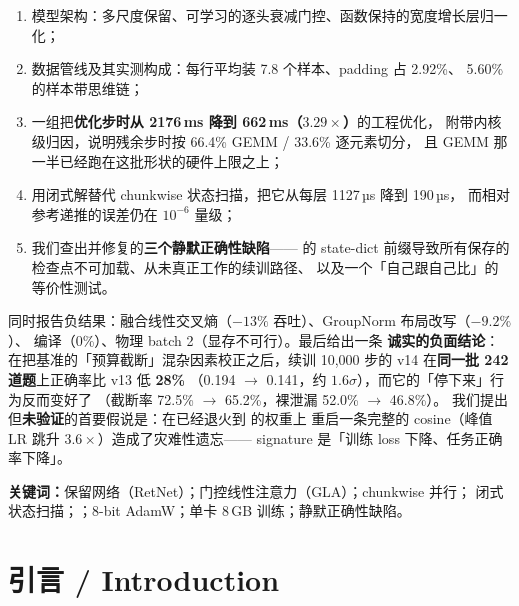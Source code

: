 \documentclass[11pt,openany]{ctexart}
\begin{document}
\begin{enumerate}[label=（\chinese{enumi}）]
\item 模型架构：多尺度保留、可学习的逐头衰减门控、函数保持的宽度增长层归一化；
\item 数据管线及其实测构成：每行平均装 7.8 个样本、padding 占 2.92\%、
      5.60\% 的样本带思维链；
\item 一组把\textbf{优化步时从 2176\,ms 降到 662\,ms（$3.29\times$）}的工程优化，
      附带内核级归因，说明残余步时按 66.4\% GEMM / 33.6\% 逐元素切分，
      且 GEMM 那一半已经跑在这批形状的硬件上限之上；
\item 用闭式解替代 chunkwise 状态扫描，把它从每层 1127\,µs 降到 190\,µs，
      而相对参考递推的误差仍在 $10^{-6}$ 量级；
\item 我们查出并修复的\textbf{三个静默正确性缺陷}—— 的
      state-dict 前缀导致所有保存的检查点不可加载、从未真正工作的续训路径、
      以及一个「自己跟自己比」的等价性测试。
\end{enumerate}

同时报告负结果：融合线性交叉熵（$-13\%$ 吞吐）、GroupNorm 布局改写（$-9.2\%$）、
 编译（0\%）、物理 batch 2（显存不可行）。最后给出一条
\textbf{诚实的负面结论}：在把基准的「预算截断」混杂因素校正之后，续训
10{,}000 步的 v14 在\textbf{同一批 242 道题}上正确率比 v13 低 \textbf{28\%}
（0.194 $\rightarrow$ 0.141，约 $1.6\sigma$），而它的「停下来」行为反而变好了
（截断率 72.5\% $\rightarrow$ 65.2\%，裸泄漏 52.0\% $\rightarrow$ 46.8\%）。
我们提出但\textbf{未验证}的首要假说是：在已经退火到  的权重上
重启一条完整的 cosine（峰值 LR 跳升 $3.6\times$）造成了灾难性遗忘——
signature 是「训练 loss 下降、任务正确率下降」。

\bigskip

{\small\textbf{关键词：}保留网络（RetNet）；门控线性注意力（GLA）；chunkwise 并行；
闭式状态扫描；；8-bit AdamW；单卡 8\,GB 训练；静默正确性缺陷。}

\clearpage

\renewcommand{\contentsname}{目录}
\tableofcontents

\clearpage


\section{引言 / Introduction}
\end{document}
